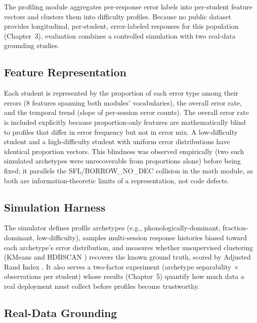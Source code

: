 The profiling module aggregates per-response error labels into per-student feature vectors and clusters them into difficulty profiles. Because no public dataset provides longitudinal, per-student, error-labeled responses for this population (Chapter~3), evaluation combines a controlled simulation with two real-data grounding studies.

\subsection{Feature Representation}
\label{sec:impl_profile_features}

Each student is represented by the proportion of each error type among their errors (8 features spanning both modules' vocabularies), the overall error rate, and the temporal trend (slope of per-session error counts). The overall error rate is included explicitly because proportion-only features are mathematically blind to profiles that differ in error frequency but not in error mix. A low-difficulty student and a high-difficulty student with uniform error distributions have identical proportion vectors. This blindness was observed empirically (two such simulated archetypes were unrecoverable from proportions alone) before being fixed; it parallels the SFL/BORROW\_NO\_DEC collision in the math module, as both are information-theoretic limits of a representation, not code defects.

\subsection{Simulation Harness}
\label{sec:impl_profile_sim}

The simulator defines profile archetypes (e.g., phonologically-dominant, fraction-dominant, low-difficulty), samples multi-session response histories biased toward each archetype's error distribution, and measures whether unsupervised clustering (KMeans and HDBSCAN \parencite{Campello2013HDBSCAN}) recovers the known ground truth, scored by Adjusted Rand Index \parencite{HubertArabie1985}. It also serves a two-factor experiment (archetype separability $\times$ observations per student) whose results (Chapter~5) quantify how much data a real deployment must collect before profiles become trustworthy.

\subsection{Real-Data Grounding}
\label{sec:impl_profile_real}

